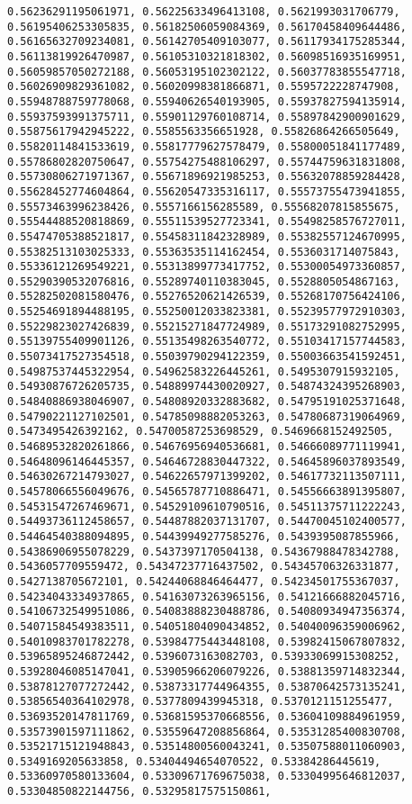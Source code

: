 \documentclass[11pt]{article}
\begin{document}
\begin{Verbatim}[commandchars=\\\{\}]
0.56236291195061971, 0.56225633496413108, 0.5621993031706779, 0.56195406253305835, 0.56182506059084369, 0.56170458409644486, 0.56165632709234081, 0.56142705409103077, 0.56117934175285344, 0.56113819926470987, 0.56105310321818302, 0.56098516935169951, 0.56059857050272188, 0.56053195102302122, 0.56037783855547718, 0.56026909829361082, 0.56020998381866871, 0.5595722228747908, 0.55948788759778068, 0.55940626540193905, 0.55937827594135914, 0.55937593991375711, 0.55901129760108714, 0.55897842900901629, 0.55875617942945222, 0.5585563356651928, 0.55826864266505649, 0.55820114841533619, 0.55817779627578479, 0.55800051841177489, 0.55786802820750647, 0.55754275488106297, 0.55744759631831808, 0.55730806271971367, 0.55671896921985253, 0.55632078859284428, 0.55628452774604864, 0.55620547335316117, 0.55573755473941855, 0.55573463996238426, 0.5557166156285589, 0.55568207815855675, 0.55544488520818869, 0.55511539527723341, 0.55498258576727011, 0.55474705388521817, 0.55458311842328989, 0.55382557124670995, 0.55382513103025333, 0.55363535114162454, 0.5536031714075843, 0.55336121269549221, 0.55313899773417752, 0.55300054973360857, 0.55290390532076816, 0.55289740110383045, 0.5528805054867163, 0.55282502081580476, 0.55276520621426539, 0.55268170756424106, 0.55254691894488195, 0.55250012033823381, 0.55239577972910303, 0.55229823027426839, 0.55215271847724989, 0.55173291082752995, 0.55139755409901126, 0.55135498263540772, 0.55103417157744583, 0.55073417527354518, 0.55039790294122359, 0.55003663541592451, 0.54987537445322954, 0.54962583226445261, 0.5495307915932105, 0.54930876726205735, 0.54889974430020927, 0.54874324395268903, 0.54840886938046907, 0.54808920332883682, 0.54795191025371648, 0.54790221127102501, 0.54785098882053263, 0.54780687319064969, 0.5473495426392162, 0.54700587253698529, 0.5469668152492505, 0.54689532820261866, 0.54676956940536681, 0.54666089771119941, 0.54648096146445357, 0.54646728830447322, 0.54645896037893549, 0.54630267214793027, 0.54622657971399202, 0.54617732113507111, 0.54578066556049676, 0.54565787710886471, 0.54556663891395807, 0.54531547267469671, 0.54529109610790516, 0.54511375711222243, 0.54493736112458657, 0.54487882037131707, 0.54470045102400577, 0.54464540388094895, 0.54439949277585276, 0.5439395087855966, 0.54386906955078229, 0.5437397170504138, 0.54367988478342788, 0.5436057709559472, 0.54347237716437502, 0.54345706326331877, 0.5427138705672101, 0.54244068846464477, 0.54234501755367037, 0.54234043334937865, 0.54163073263965156, 0.54121666882045716, 0.54106732549951086, 0.54083888230488786, 0.54080934947356374, 0.54071584549383511, 0.54051804090434852, 0.54040096359006962, 0.54010983701782278, 0.53984775443448108, 0.53982415067807832, 0.53965895246872442, 0.5396073163082703, 0.53933069915308252, 0.53928046085147041, 0.53905966206079226, 0.53881359714832344, 0.53878127077272442, 0.53873317744964355, 0.53870642573135241, 0.53856540364102978, 0.5377809439945318, 0.5370121151255477, 0.53693520147811769, 0.53681595370668556, 0.53604109884961959, 0.53573901597111862, 0.53559647208856864, 0.53531285400830708, 0.53521715121948843, 0.53514800560043241, 0.53507588011060903, 0.5349169205633858, 0.53404494654070522, 0.53384286445619, 0.53360970580133604, 0.53309671769675038, 0.53304995646812037, 0.53304850822144756, 0.53295817575150861, 
\end{Verbatim}
\end{document}
